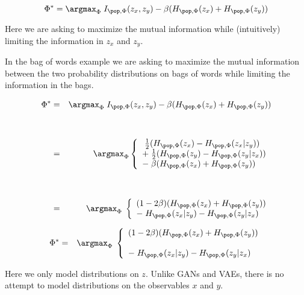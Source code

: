 {\vfill
$$\Phi^* = \argmax_{\Phi} \; I_{\pop,\Phi}(z_x,z_y) - \beta (H_{\pop,\Phi}(z_x) + H_{\pop,\Phi}(z_y))$$

\vfill
Here we are asking to maximize the mutual information while (intuitively) limiting the information in $z_x$ and $z_y$.

\vfill
In the bag of words example we are asking to maximize the mutual information between the two probability distributions on bags of words while limiting the information in the bags.


\begin{eqnarray*}
\Phi^* & = & \argmax_{\Phi} \; I_{\pop,\Phi}(z_x,z_y) - \beta (H_{\pop,\Phi}(z_x) + H_{\pop,\Phi}(z_y)) \\
\\
\\
 & = & \argmax_{\Phi} \left\{\begin{array}{l}\; \frac{1}{2}(H_{\pop,\Phi}(z_x) - H_{\pop,\Phi}(z_x|z_y)) \\
                                              +\;\frac{1}{2}(H_{\pop,\Phi}(z_y) - H_{\pop,\Phi}(z_y|z_x)) \\
                                              - \;\beta (H_{\pop,\Phi}(z_x) + H_{\pop,\Phi}(z_y)) \end{array}\right. \\
\\
\\
 & = & \argmax_{\Phi} \; \left\{\begin{array}{l}(1-2\beta)(H_{\pop,\Phi}(z_x)+ H_{\pop,\Phi}(z_y)) \\ -\; H_{\pop,\Phi}(z_x|z_y) - H_{\pop,\Phi}(z_y|z_x) \end{array}\right.
\end{eqnarray*}


\begin{eqnarray*}
\Phi^* & = & \argmax_{\Phi} \; \left\{\begin{array}{l}(1-2\beta)(H_{\pop,\Phi}(z_x)+ H_{\pop,\Phi}(z_y)) \\
\\
-\; H_{\pop,\Phi}(z_x|z_y) - H_{\pop,\Phi}(z_y|z_x) \end{array}\right.
\end{eqnarray*}

\vfill
Here we only model distributions on $z$.  Unlike GANs and VAEs, there is no attempt to model distributions on the observables $x$ and $y$.

}
